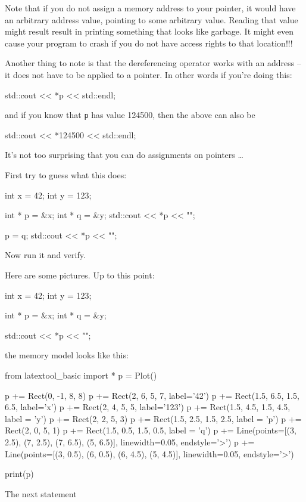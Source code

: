 Note that if you do not assign a memory address to your pointer, it would have an arbitrary address value, pointing to some arbitrary value.
Reading that value might result result in printing something that looks like garbage. It might even cause your program to crash if you do not have access rights to that location!!!

Another thing to note is that the dereferencing operator works with an address -- it does not have to be applied to a pointer. In other words if you're doing this:

\begin{consolethree}[escapeinside=||]
std::cout << *p << std::endl;
\end{consolethree}

and if you know that \texttt{p} has value 124500, then the above can also be

\begin{consolethree}[escapeinside=||]
std::cout << *124500 << std::endl;
\end{consolethree}



\newpage{}

It's not too surprising that you can do assignments on pointers \ldots{}

First try to guess what this does:

\begin{consolethree}[escapeinside=||]
int x = 42;
int y = 123;

int * p = &x;
int * q = &y;
std::cout << *p << "\n";

p = q;
std::cout << *p << "\n";
\end{consolethree}
Now run it and verify.

Here are some pictures. Up to this point:

\begin{consolethree}[escapeinside=||]
int x = 42;
int y = 123;

int * p = &x;
int * q = &y;

std::cout << *p << "\n";
\end{consolethree}
the memory model looks like this:
\begin{python}
from latextool_basic import *
p = Plot()

p += Rect(0, -1, 8, 8)
p += Rect(2, 6, 5, 7, label='42')
p += Rect(1.5, 6.5, 1.5, 6.5, label='x')
p += Rect(2, 4, 5, 5, label='123')
p += Rect(1.5, 4.5, 1.5, 4.5, label = 'y')
p += Rect(2, 2, 5, 3)
p += Rect(1.5, 2.5, 1.5, 2.5, label = 'p')
p += Rect(2, 0, 5, 1)
p += Rect(1.5, 0.5, 1.5, 0.5, label = 'q')
p += Line(points=[(3, 2.5), (7, 2.5), (7, 6.5), (5, 6.5)], linewidth=0.05, endstyle='>')
p += Line(points=[(3, 0.5), (6, 0.5), (6, 4.5), (5, 4.5)], linewidth=0.05, endstyle='>')

print(p)
\end{python}
The next statement

